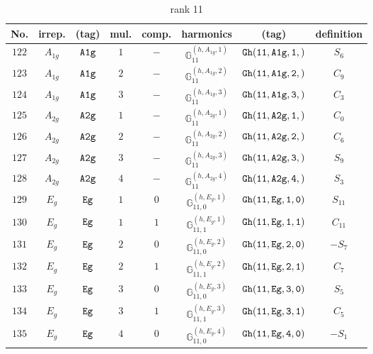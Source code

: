 \documentclass[fleqn,8pt]{jsarticle}
\begin{document}
\begin{table}[ht!]
\begin{center}
\caption{rank 11}
\renewcommand{\arraystretch}{1.3}
\begin{tabular}{cccccccc} \hline \hline
No. & irrep. & (tag) & mul. & comp. & harmonics & (tag) & definition \\ \hline
$ 122 $ & $ A_{1g} $ & $ {\tt A1g} $ & $ 1 $ & $ - $ & $ \mathbb{G}_{11}^{(h,A_{1g},1)} $ & $ {\tt Gh(11,A1g,1,)} $ & $ S_{6} $ \\
$ 123 $ & $ A_{1g} $ & $ {\tt A1g} $ & $ 2 $ & $ - $ & $ \mathbb{G}_{11}^{(h,A_{1g},2)} $ & $ {\tt Gh(11,A1g,2,)} $ & $ C_{9} $ \\
$ 124 $ & $ A_{1g} $ & $ {\tt A1g} $ & $ 3 $ & $ - $ & $ \mathbb{G}_{11}^{(h,A_{1g},3)} $ & $ {\tt Gh(11,A1g,3,)} $ & $ C_{3} $ \\
$ 125 $ & $ A_{2g} $ & $ {\tt A2g} $ & $ 1 $ & $ - $ & $ \mathbb{G}_{11}^{(h,A_{2g},1)} $ & $ {\tt Gh(11,A2g,1,)} $ & $ C_{0} $ \\
$ 126 $ & $ A_{2g} $ & $ {\tt A2g} $ & $ 2 $ & $ - $ & $ \mathbb{G}_{11}^{(h,A_{2g},2)} $ & $ {\tt Gh(11,A2g,2,)} $ & $ C_{6} $ \\
$ 127 $ & $ A_{2g} $ & $ {\tt A2g} $ & $ 3 $ & $ - $ & $ \mathbb{G}_{11}^{(h,A_{2g},3)} $ & $ {\tt Gh(11,A2g,3,)} $ & $ S_{9} $ \\
$ 128 $ & $ A_{2g} $ & $ {\tt A2g} $ & $ 4 $ & $ - $ & $ \mathbb{G}_{11}^{(h,A_{2g},4)} $ & $ {\tt Gh(11,A2g,4,)} $ & $ S_{3} $ \\
$ 129 $ & $ E_{g} $ & $ {\tt Eg} $ & $ 1 $ & $ 0 $ & $ \mathbb{G}_{11,0}^{(h,E_{g},1)} $ & $ {\tt Gh(11,Eg,1,0)} $ & $ S_{11} $ \\
$ 130 $ & $ E_{g} $ & $ {\tt Eg} $ & $ 1 $ & $ 1 $ & $ \mathbb{G}_{11,1}^{(h,E_{g},1)} $ & $ {\tt Gh(11,Eg,1,1)} $ & $ C_{11} $ \\
$ 131 $ & $ E_{g} $ & $ {\tt Eg} $ & $ 2 $ & $ 0 $ & $ \mathbb{G}_{11,0}^{(h,E_{g},2)} $ & $ {\tt Gh(11,Eg,2,0)} $ & $ - S_{7} $ \\
$ 132 $ & $ E_{g} $ & $ {\tt Eg} $ & $ 2 $ & $ 1 $ & $ \mathbb{G}_{11,1}^{(h,E_{g},2)} $ & $ {\tt Gh(11,Eg,2,1)} $ & $ C_{7} $ \\
$ 133 $ & $ E_{g} $ & $ {\tt Eg} $ & $ 3 $ & $ 0 $ & $ \mathbb{G}_{11,0}^{(h,E_{g},3)} $ & $ {\tt Gh(11,Eg,3,0)} $ & $ S_{5} $ \\
$ 134 $ & $ E_{g} $ & $ {\tt Eg} $ & $ 3 $ & $ 1 $ & $ \mathbb{G}_{11,1}^{(h,E_{g},3)} $ & $ {\tt Gh(11,Eg,3,1)} $ & $ C_{5} $ \\
$ 135 $ & $ E_{g} $ & $ {\tt Eg} $ & $ 4 $ & $ 0 $ & $ \mathbb{G}_{11,0}^{(h,E_{g},4)} $ & $ {\tt Gh(11,Eg,4,0)} $ & $ - S_{1} $ \\

\end{tabular}
\end{center}
\end{table}
\end{document}
